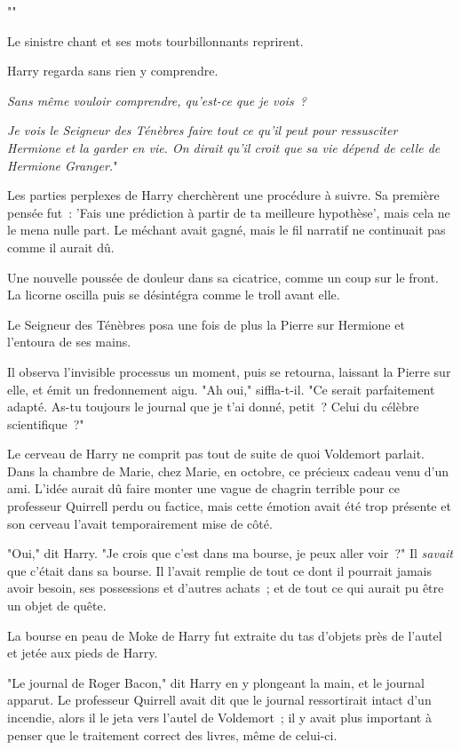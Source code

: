 ""

Le sinistre chant et ses mots tourbillonnants reprirent.

Harry regarda sans rien y comprendre.

\emph{Sans même vouloir comprendre, qu'est-ce que je vois~?}

\emph{Je vois le Seigneur des Ténèbres faire tout ce qu'il peut pour ressusciter Hermione et la garder en vie. On dirait qu'il croit que sa vie dépend de celle de Hermione Granger.}"

Les parties perplexes de Harry cherchèrent une procédure à suivre. Sa première pensée fut~: 'Fais une prédiction à partir de ta meilleure hypothèse', mais cela ne le mena nulle part. Le méchant avait gagné, mais le fil narratif ne continuait pas comme il aurait dû.

Une nouvelle poussée de douleur dans sa cicatrice, comme un coup sur le front. La licorne oscilla puis se désintégra comme le troll avant elle.

Le Seigneur des Ténèbres posa une fois de plus la Pierre sur Hermione et l'entoura de ses mains.

Il observa l'invisible processus un moment, puis se retourna, laissant la Pierre sur elle, et émit un fredonnement aigu. "Ah oui," siffla-t-il. "Ce serait parfaitement adapté. As-tu toujours le journal que je t'ai donné, petit~? Celui du célèbre scientifique~?"

Le cerveau de Harry ne comprit pas tout de suite de quoi Voldemort parlait. Dans la chambre de Marie, chez Marie, en octobre, ce précieux cadeau venu d'un ami. L'idée aurait dû faire monter une vague de chagrin terrible pour ce professeur Quirrell perdu ou factice, mais cette émotion avait été trop présente et son cerveau l'avait temporairement mise de côté.

"Oui," dit Harry. "Je crois que c'est dans ma bourse, je peux aller voir~?" Il \emph{savait} que c'était dans sa bourse. Il l'avait remplie de tout ce dont il pourrait jamais avoir besoin, ses possessions et d'autres achats~; et de tout ce qui aurait pu être un objet de quête.

La bourse en peau de Moke de Harry fut extraite du tas d'objets près de l'autel et jetée aux pieds de Harry.

"Le journal de Roger Bacon," dit Harry en y plongeant la main, et le journal apparut. Le professeur Quirrell avait dit que le journal ressortirait intact d'un incendie, alors il le jeta vers l'autel de Voldemort~; il y avait plus important à penser que le traitement correct des livres, même de celui-ci.

